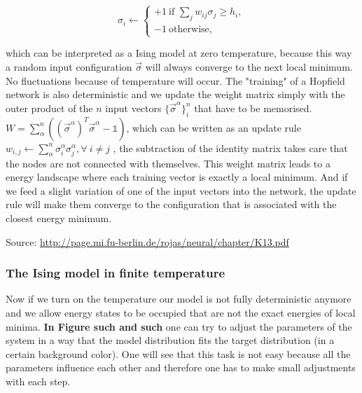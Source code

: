 \documentclass[nofootinbib, superscriptaddress, prl]{revtex4}
\begin{document}
\begin{equation}
	\sigma_{i}\leftarrow \left\{{\begin{array}{ll}+1~{\mbox{if }}\sum _{{j}}{w_{{ij}}\sigma_{j}}\geq h _{i},\\-1~{\mbox{otherwise,}}\end{array}}\right.
\end{equation}

which can be interpreted as a Ising model at zero temperature, because this way a random input configuration $\vec{\sigma}$ will always converge to the next local minimum. No fluctuations because of temperature will occur. 
The "training" of a Hopfield network is also deterministic and we update the weight matrix simply with the outer product of the $n$ input vectors $\{ \vec{\sigma}^{\alpha}\}_i^n$ that have to be memorised. $W = \sum_{\alpha}^n( (\vec{\sigma}^{\alpha})^T \vec{\sigma}^{\alpha} - \mathbb{1}) $, which can be written as an update rule $w_{i,j} \leftarrow \sum_{\alpha}^n \sigma_i^{\alpha} \sigma_j^{\alpha}, \forall~i \neq j$
, the subtraction of the identity matrix takes care that the nodes are not connected with themselves.
This weight matrix leads to a energy landscape where each training vector is exactly a local minimum. And if we feed a slight variation of one of the input vectors into the network, the update rule will make them converge to the configuration that is associated with the closest energy minimum. 

Source: \url{http://page.mi.fu-berlin.de/rojas/neural/chapter/K13.pdf}

\subsubsection{The Ising model in finite temperature}

Now if we turn on the temperature our model is not fully deterministic anymore and we allow energy states to be occupied that are not the exact energies of local minima.
\textbf{In Figure such and such } one can try to adjust the parameters of the system in a way that the model distribution fits the target distribution (in a certain background color). One will see that this task is not easy because all the parameters influence each other and therefore one has to make small adjustments with each step.
\end{document}
